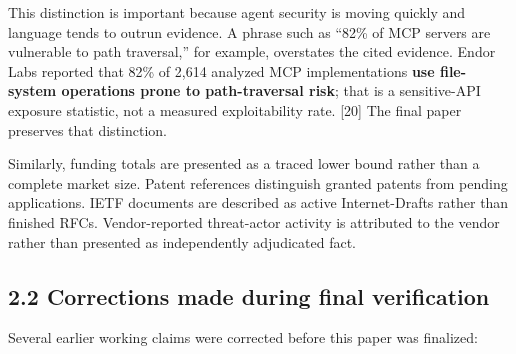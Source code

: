 \documentclass[
  10pt,
  letterpaper,
]{article}
\begin{document}
This distinction is important because agent security is moving quickly
and language tends to outrun evidence. A phrase such as ``82\% of MCP
servers are vulnerable to path traversal,'' for example, overstates the
cited evidence. Endor Labs reported that 82\% of 2,614 analyzed MCP
implementations \textbf{use file-system operations prone to
path-traversal risk}; that is a sensitive-API exposure statistic, not a
measured exploitability rate. {[}20{]} The final paper preserves that
distinction.

Similarly, funding totals are presented as a traced lower bound rather
than a complete market size. Patent references distinguish granted
patents from pending applications. IETF documents are described as
active Internet-Drafts rather than finished RFCs. Vendor-reported
threat-actor activity is attributed to the vendor rather than presented
as independently adjudicated fact.

\subsection{2.2 Corrections made during final
verification}\label{corrections-made-during-final-verification}

Several earlier working claims were corrected before this paper was
finalized:
\end{document}
